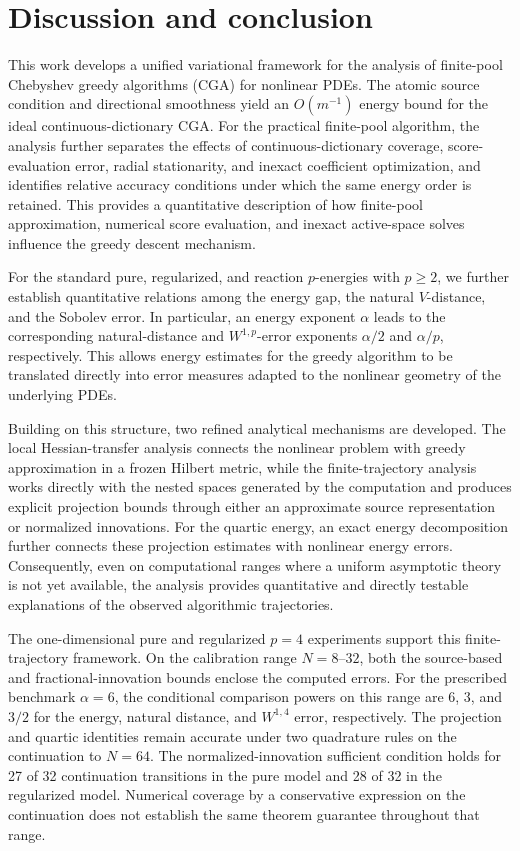 \section{Discussion and conclusion}
\label{sec:discussion}

This work develops a unified variational framework for the analysis of finite-pool
Chebyshev greedy algorithms (CGA) for nonlinear PDEs. The atomic source condition and
directional smoothness yield an $O(m^{-1})$ energy bound for the ideal
continuous-dictionary CGA. For the practical finite-pool algorithm, the analysis further
separates the effects of continuous-dictionary coverage, score-evaluation error, radial
stationarity, and inexact coefficient optimization, and identifies relative accuracy
conditions under which the same energy order is retained. This provides a quantitative
description of how finite-pool approximation, numerical score evaluation, and inexact
active-space solves influence the greedy descent mechanism.

For the standard pure, regularized, and reaction $p$-energies with $p\geq2$, we further
establish quantitative relations among the energy gap, the natural $V$-distance, and the
Sobolev error. In particular, an energy exponent $\alpha$ leads to the corresponding
natural-distance and $W^{1,p}$-error exponents $\alpha/2$ and $\alpha/p$, respectively.
This allows energy estimates for the greedy algorithm to be translated directly into error
measures adapted to the nonlinear geometry of the underlying PDEs.

Building on this structure, two refined analytical mechanisms are developed. The local
Hessian-transfer analysis connects the nonlinear problem with greedy approximation in a
frozen Hilbert metric, while the finite-trajectory analysis works directly with the nested
spaces generated by the computation and produces explicit projection bounds through either
an approximate source representation or normalized innovations. For the quartic energy, an
exact energy decomposition further connects these projection estimates with nonlinear
energy errors. Consequently, even on computational ranges where a uniform asymptotic
theory is not yet available, the analysis provides quantitative and directly testable
explanations of the observed algorithmic trajectories.

The one-dimensional pure and regularized $p=4$ experiments support this
finite-trajectory framework. On the calibration range $N=8$--$32$, both the
source-based and fractional-innovation bounds enclose the computed errors.
For the prescribed benchmark $\alpha=6$, the conditional comparison powers
on this range are $6$, $3$, and $3/2$ for the energy, natural distance, and
$W^{1,4}$ error, respectively. The projection and quartic identities remain
accurate under two quadrature rules on the continuation to $N=64$.
The normalized-innovation sufficient condition holds for 27 of 32 continuation
transitions in the pure model and 28 of 32 in the regularized model.
Numerical coverage by a conservative expression on the continuation does not
establish the same theorem guarantee throughout that range.

